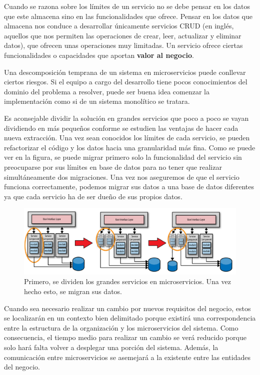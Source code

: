 \documentclass[11pt,spanish,listoffigures,listoftables]{tfgetsinf}
\begin{document}
Cuando se razona sobre los límites de un servicio no se debe pensar en los datos que este almacena sino en las funcionalidades que ofrece. Pensar en los datos que almacena nos conduce a desarrollar únicamente servicios CRUD (en inglés, aquellos que nos permiten las operaciones de crear, leer, actualizar y eliminar datos), que ofrecen unas operaciones muy limitadas. Un servicio ofrece ciertas funcionalidades o capacidades que aportan \textbf{valor al negocio}.

Una descomposición temprana de un sistema en microservicios puede conllevar ciertos riesgos. Si el equipo a cargo del desarrollo tiene pocos conocimientos del dominio del problema a resolver, puede  ser buena idea comenzar la implementación como si de un sistema monolítico se tratara. 

Es aconsejable dividir la solución en grandes servicios que poco a poco se vayan dividiendo en más pequeños conforme se estudien las ventajas de hacer cada nueva extracción. Una vez sean conocidos los límites de cada servicio, se pueden refactorizar el código y los datos hacia una granularidad más fina. Como se puede ver en la figura, se puede migrar primero solo la funcionalidad del servicio sin preocuparse por sus límites en base de datos para no tener que realizar simultáneamente dos migraciones. Una vez nos aseguremos de que el servicio funciona correctamente, podemos migrar sus datos a una base de datos diferentes ya que cada servicio ha de ser dueño de sus propios datos. \cite{Richards2016}

\begin{figure}[h]
\centering
\includegraphics[scale=0.4]{refactoring}
\caption{Primero, se dividen los grandes servicios en microservicios. Una vez hecho esto, se migran sus datos. \cite{Richards2016}}
\end{figure}

Cuando sea necesario realizar un cambio por nuevos requisitos del negocio, estos se localizarán en un contexto bien delimitado porque existirá una correspondencia entre la estructura de la organización y los microservicios del sistema. Como consecuencia, el tiempo medio para realizar un cambio se verá reducido porque solo hará falta volver a desplegar una porción del sistema. Además, la comunicación entre microservicios se asemejará a la existente entre las entidades del negocio.
\end{document}
